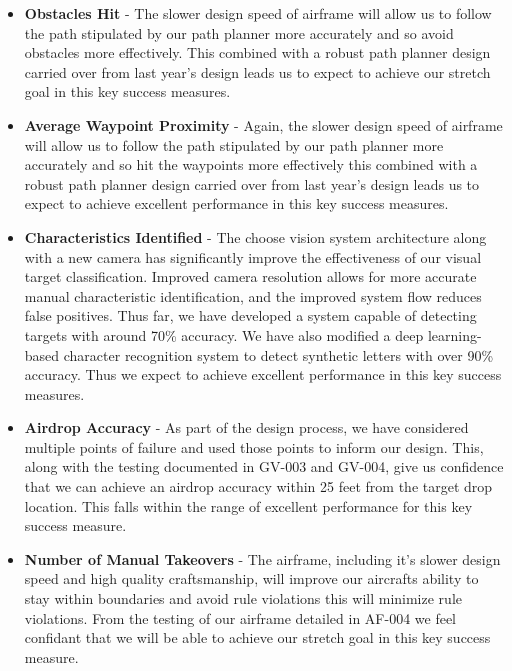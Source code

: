 \documentclass{auvsi_doc}
\begin{document}
\begin{itemize}
	\item\textbf{Obstacles Hit} - The slower design speed of airframe will allow us to follow the path stipulated by our path planner more accurately and so avoid obstacles more effectively. This combined with a robust path planner design carried over from last year's design leads us to expect to achieve our stretch goal in this key success measures.
	\item\textbf{Average Waypoint Proximity} - Again, the slower design speed of airframe will allow us to follow the path stipulated by our path planner more accurately and so hit the waypoints more effectively this combined with a robust path planner design carried over from last year's design leads us to expect to achieve excellent performance in this key success measures.
	\item\textbf{Characteristics Identified} - The choose vision system architecture along with a new camera has significantly improve the effectiveness of our visual target classification. Improved camera resolution allows for more accurate manual characteristic identification, and the improved system flow reduces false positives. Thus far, we have developed a system capable of detecting targets with around 70\% accuracy. We have also modified a deep learning-based character recognition system to detect synthetic letters with over 90\% accuracy. Thus we expect to achieve excellent performance in this key success measures.
	\item\textbf{Airdrop Accuracy} - As part of the design process, we have considered multiple points of failure and used those points to inform our design. This, along with the testing documented in GV-003 and GV-004, give us confidence that we can achieve an airdrop accuracy within 25 feet from the target drop location. This falls within the range of excellent performance for this key success measure.
	\item\textbf{Number of Manual Takeovers} - The airframe, including it's slower design speed and high quality craftsmanship, will improve our aircrafts ability to stay within boundaries and avoid rule violations this will minimize rule violations. From the testing of our airframe detailed in AF-004 we feel confidant that we will be able to achieve our stretch goal in this key success measure.
\end{itemize}
 
\end{document}
